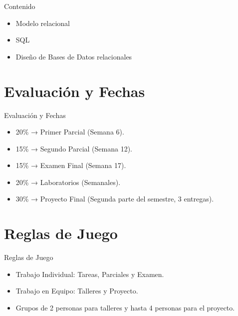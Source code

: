 \documentclass[aspectratio=169]{beamer}
\begin{document}
\begin{frame}{Contenido}
\begin{itemize}
    \item Modelo relacional
    \item SQL
    \item Diseño de Bases de Datos relacionales
\end{itemize}
\end{frame}

\section{Evaluación y Fechas}

\begin{frame}{Evaluación y Fechas}
    \begin{itemize}
        \item 20\% → Primer Parcial (Semana 6).
        \item 15\% → Segundo Parcial (Semana 12).
        \item 15\% → Examen Final (Semana 17).
        \item 20\% → Laboratorios (Semanales).
        \item 30\% → Proyecto Final (Segunda parte del semestre, 3 entregas).
    \end{itemize}
\end{frame}

\section{Reglas de Juego}

\begin{frame}{Reglas de Juego}
\begin{itemize}
    \item Trabajo Individual: Tareas, Parciales y Examen.
    \item Trabajo en Equipo: Talleres y Proyecto.
    \item Grupos de 2 personas para talleres y hasta 4 personas para el proyecto.
\end{itemize}
\end{frame}
\end{document}
